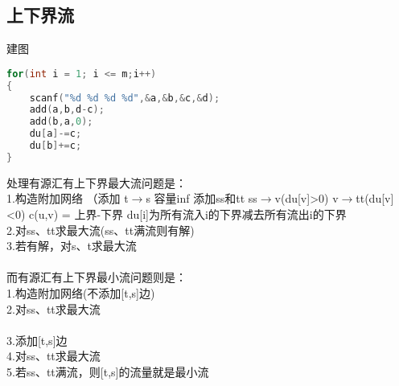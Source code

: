 \subsection{上下界流}
建图
    \begin{lstlisting}[language=c++]
for(int i = 1; i <= m;i++)
{
	scanf("%d %d %d %d",&a,&b,&c,&d);   
    add(a,b,d-c);
    add(b,a,0);
    du[a]-=c;
    du[b]+=c;
}
    \end{lstlisting}
处理有源汇有上下界最大流问题是：\\
1.构造附加网络   （添加 t$\to$s 容量inf 添加ss和tt  ss$\to$v(du[v]>0) v$\to$tt(du[v]<0)  c(u,v) = 上界-下界  du[i]为所有流入i的下界减去所有流出i的下界\\
2.对ss、tt求最大流(ss、tt满流则有解)\\
3.若有解，对s、t求最大流\\
\\
而有源汇有上下界最小流问题则是：\\
1.构造附加网络(不添加[t,s]边)\\
2.对ss、tt求最大流\\
\\
3.添加[t,s]边\\
4.对ss、tt求最大流\\
5.若ss、tt满流，则[t,s]的流量就是最小流\\
